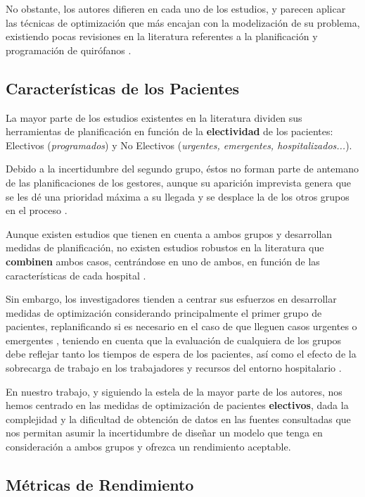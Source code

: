 No obstante, los autores difieren en cada uno de los estudios, y parecen aplicar las técnicas de optimización que más encajan con la modelización de su problema, existiendo pocas revisiones en la literatura referentes a la planificación y programación de quirófanos \cite{Gur2018ApplicationOverview}. 

\subsection{Características de los Pacientes}

La mayor parte de los estudios existentes en la literatura dividen sus herramientas de planificación en función de la \textbf{electividad} de los pacientes: Electivos (\textit{programados}) y No Electivos (\textit{urgentes, emergentes, hospitalizados...}).

Debido a la incertidumbre del segundo grupo, éstos no forman parte de antemano de las planificaciones de los gestores, aunque su aparición imprevista genera que se les dé una prioridad máxima a su llegada y se desplace la de los otros grupos en el proceso \cite{CAYIRLI2009OUTPATIENTLITERATURE} .

Aunque existen estudios que tienen en cuenta a ambos grupos y desarrollan medidas de planificación, no existen estudios robustos en la literatura que \textbf{combinen} ambos casos, centrándose en uno de ambos, en función de las características de cada hospital \cite{Gur2018ApplicationOverview}.

Sin embargo, los investigadores tienden a centrar sus esfuerzos en desarrollar medidas de optimización considerando principalmente el primer grupo de pacientes, replanificando si es necesario en el caso de que lleguen casos urgentes o emergentes \cite{Nouaouri2011OperatingDisaster}, teniendo en cuenta que la evaluación de cualquiera de los grupos debe reflejar tanto los tiempos de espera de los pacientes, así como el efecto de la sobrecarga de trabajo en los trabajadores y recursos del entorno hospitalario \cite{Gur2018ApplicationOverview}.

En nuestro trabajo, y siguiendo la estela de la mayor parte de los autores, nos hemos centrado en las medidas de optimización de pacientes \textbf{electivos}, dada la complejidad y la dificultad de obtención de datos en las fuentes consultadas que nos permitan asumir la incertidumbre de diseñar un modelo que tenga en consideración a ambos grupos y ofrezca un rendimiento aceptable.

\subsection{Métricas de Rendimiento}

